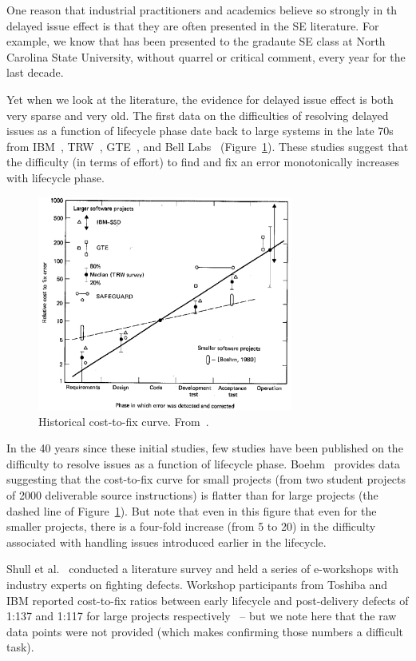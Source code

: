 One reason that industrial practitioners and academics believe so strongly in th delayed issue effect is that they are often presented in the SE literature. For example,
we know that  has been presented to the gradaute SE class at North Carolina State University, without quarrel or critical comment, every year for the last decade.

Yet when we look at the literature, the evidence for
delayed issue effect is both very sparse and very old.
The first data on the difficulties of resolving delayed issues as a function of lifecycle phase date back to large systems in the late 70s from IBM~\cite{Fagan76}, TRW~\cite{Boehm76}, GTE~\cite{Daly77}, and Bell Labs~\cite{Stephenson76} (Figure~\ref{fig:cost-to-fix}). These studies suggest that the difficulty (in terms of effort) to find and fix an error monotonically increases with lifecycle phase. 

\begin{figure}[!b]
 \includegraphics[width=3.3in]{img/boehm_cost-to-fix.png}
 \caption{Historical cost-to-fix curve. From~\cite{Boehm81}.}\label{fig:cost-to-fix}
 \end{figure}
 
In the 40 years since these initial studies, few studies have been published on the difficulty to resolve issues
as a function of lifecycle phase. Boehm~\cite{Boehm80} provides data suggesting that the cost-to-fix curve for small projects (from two student projects of 2000 deliverable source instructions) is flatter than for large projects (the dashed line of Figure~\ref{fig:cost-to-fix}). But note that even in this figure
that even for the smaller projects, there is a four-fold increase (from 5 to 20) in the difficulty
associated with handling issues introduced earlier in the lifecycle.

Shull et al.~\cite{Shull02} conducted a literature survey and held a series of e-workshops with industry experts on fighting defects. Workshop participants from Toshiba and IBM reported cost-to-fix ratios between early lifecycle and post-delivery defects of 1:137 and 1:117 for large projects respectively~\cite{Shull02} -- but we note here that the raw data points were not provided (which makes confirming those numbers 
a difficult task). 

